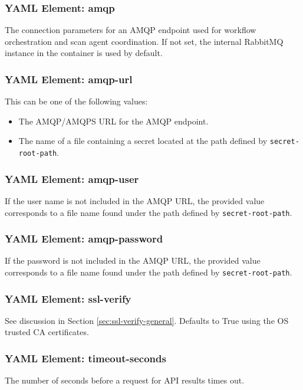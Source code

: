 \subsubsection{YAML Element: amqp}\label{sec:yaml-generic-amqp}
The connection parameters for an AMQP endpoint used for workflow orchestration and scan agent coordination. 
If not set, the internal RabbitMQ instance in the \cxoneflow container is used by default.

\subsubsection{YAML Element: amqp-url}\label{sec:yaml-generic-amqp-amqp-url}
This can be one of the following values:

\begin{itemize}
  \item The AMQP/AMQPS URL for the AMQP endpoint.
  \item The name of a file containing a secret located at the path defined by \texttt{secret-root-path}.
\end{itemize}


\subsubsection{YAML Element: amqp-user}\label{sec:yaml-generic-amqp-amqp-user}
If the user name is not included in the AMQP URL, the provided value corresponds to a file name found under
the path defined by \texttt{secret-root-path}.

\subsubsection{YAML Element: amqp-password}\label{sec:yaml-generic-amqp-amqp-password}
If the password is not included in the AMQP URL, the provided value corresponds to a file name found
under the path defined by \texttt{secret-root-path}.


\subsubsection{YAML Element: ssl-verify}\label{sec:yaml-generic-ssl-verify}
See discussion in Section \ref{sec:ssl-verify-general}.  Defaults to True using the OS trusted CA certificates.

\subsubsection{YAML Element: timeout-seconds}\label{sec:yaml-generic-timeout-seconds}
The number of seconds before a request for API results times out.

